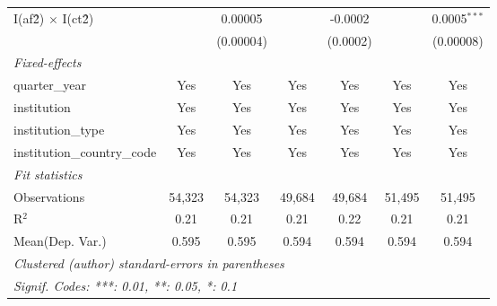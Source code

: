 \begin{tabular}{lcccccc}
   I(af\^2) $\times$ I(ct\^2)         &               & 0.00005        &               & -0.0002        &               & 0.0005$^{***}$\\   
                                      &               & (0.00004)      &               & (0.0002)       &               & (0.00008)\\   
   \midrule
   \emph{Fixed-effects}\\
   quarter\_year                      & Yes           & Yes            & Yes           & Yes            & Yes           & Yes\\  
   institution                        & Yes           & Yes            & Yes           & Yes            & Yes           & Yes\\  
   institution\_type                  & Yes           & Yes            & Yes           & Yes            & Yes           & Yes\\  
   institution\_country\_code         & Yes           & Yes            & Yes           & Yes            & Yes           & Yes\\  
   \midrule
   \emph{Fit statistics}\\
   Observations                       & 54,323        & 54,323         & 49,684        & 49,684         & 51,495        & 51,495\\  
   R$^2$                              & 0.21          & 0.21           & 0.21          & 0.22           & 0.21          & 0.21\\  
Mean(Dep. Var.) & 0.595 & 0.595 & 0.594 & 0.594 & 0.594 & 0.594 \\
   \midrule \midrule
   \multicolumn{7}{l}{\emph{Clustered (author) standard-errors in parentheses}}\\
   \multicolumn{7}{l}{\emph{Signif. Codes: ***: 0.01, **: 0.05, *: 0.1}}\\
\end{tabular}
\par\endgroup
